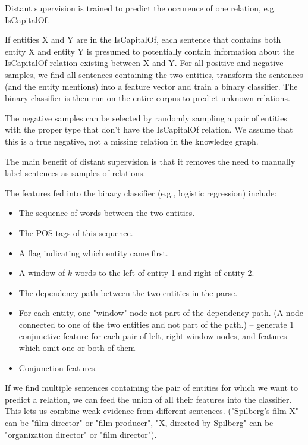 Distant supervision is trained to predict the occurence of one relation,
e.g. IsCapitalOf.

If entities X and Y are in the IsCapitalOf, each sentence that contains both
entity X and entity Y is presumed to potentially contain information about
the IsCapitalOf relation existing between X and Y.
For all positive and negative samples, we find all sentences containing the two
entities, transform the sentences (and the entity mentions) into a feature
vector and train a binary classifier.
The binary classifier is then run on the entire corpus to predict unknown
relations.

The negative samples can be selected
by randomly sampling a pair of entities with the proper type that don't have the
IsCapitalOf relation. We assume that this is a true negative, not a missing
relation in the knowledge graph.

The main benefit of distant supervision is that it removes the need to manually
label sentences as samples of relations.

The features fed into the binary classifier (e.g., logistic regression)
include:
\begin{itemize}
\item The sequence of words between the two entities.
\item The POS tags of this sequence.
\item A flag indicating which entity came first.
\item A window of $k$ words to the left of entity 1 and right of entity 2.
\item The dependency path between the two entities in the parse.
\item For each entity, one "window" node not part of the dependency path.
	(A node connected to one of the two entities and not part of the path.)
		-- generate 1 conjunctive feature for each pair of left, right
		window nodes, and features which omit one or both of them
	\cite{distant-supervision}
\item Conjunction features.
\end{itemize}

If we find multiple sentences containing the pair of entities for which we want
to predict a relation, we can feed the union of all their features into
the classifier. This lets us combine weak evidence from different sentences.
("Spilberg's film X" can be "film director" or "film producer", "X, directed by
Spilberg" can be "organization director" or "film director").


